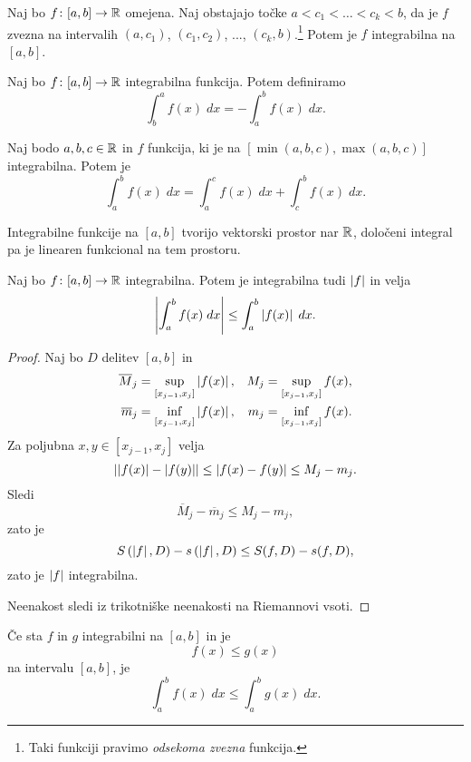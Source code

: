 \documentclass[12pt, a4paper]{article}
\begin{document}
\begin{posledica}
Naj bo $f\colon[a,b]\to\mathbb{R}$ omejena. Naj obstajajo točke $a<c_1<\dots<c_k<b$, da je $f$ zvezna na intervalih $(a,c_1)$, $(c_1,c_2)$, ..., $(c_k,b)$.\footnote{Taki funkciji pravimo \emph{odsekoma zvezna} funkcija.} Potem je $f$ integrabilna na $[a,b]$.
\end{posledica}

\begin{definicija}
Naj bo $f\colon[a,b]\to\mathbb{R}$ integrabilna funkcija. Potem definiramo
\[
\int_b^a f(x)\;dx=-\int_a^b f(x)\;dx.
\]
\end{definicija}

\begin{posledica}
Naj bodo $a,b,c\in\mathbb{R}$ in $f$ funkcija, ki je na $[\min(a,b,c),\max(a,b,c)]$ integrabilna. Potem je
\[
\int_a^b f(x)\;dx=\int_a^c f(x)\;dx+\int_c^b f(x)\;dx.
\]
\end{posledica}

\begin{trditev}
Integrabilne funkcije na $[a,b]$ tvorijo vektorski prostor nar $\mathbb{R}$, določeni integral pa je linearen funkcional na tem prostoru.
\end{trditev}

\obvs

\begin{trditev}
Naj bo $f\colon[a,b]\to\mathbb{R}$ integrabilna. Potem je integrabilna tudi $\left\lvert f\right\rvert$ in velja
\[
\left\lvert \int_a^b f(x)\;dx\right\rvert\leq \int_a^b \left\lvert f(x)\right\rvert\;dx.
\]
\end{trditev}

\begin{proof}
Naj bo $D$ delitev $[a,b]$ in
\begin{align*}
\overline{M}_j&=\sup_{[x_{j-1},x_j]}\left\lvert f(x)\right\rvert, &M_j&=\sup_{[x_{j-1},x_j]}f(x), \\
\overline{m}_j&=\inf_{[x_{j-1},x_j]}\left\lvert f(x)\right\rvert, &m_j&=\inf_{[x_{j-1},x_j]}f(x).
\end{align*}
Za poljubna $x,y\in[x_{j-1},x_j]$ velja
\[
\left\lvert \left\lvert f(x)\right\rvert-\left\lvert f(y)\right\rvert\right\rvert\leq\left\lvert f(x)-f(y)\right\rvert\leq M_j-m_j.
\]
Sledi
\[
\overline{M}_j-\overline{m}_j\leq M_j-m_j,
\]
zato je
\[
S\left(\left\lvert f\right\rvert,D\right)-s\left(\left\lvert f\right\rvert,D\right)\leq S(f,D)-s(f,D),
\]
zato je $\left\lvert f\right\rvert$ integrabilna.

Neenakost sledi iz trikotniške neenakosti na Riemannovi vsoti.
\end{proof}

\begin{trditev}
Če sta $f$ in $g$ integrabilni na $[a,b]$ in je
\[
f(x)\leq g(x)
\]
na intervalu $[a,b]$, je
\[
\int_a^b f(x)\;dx\leq \int_a^b g(x)\;dx.
\]
\end{trditev}
\end{document}
